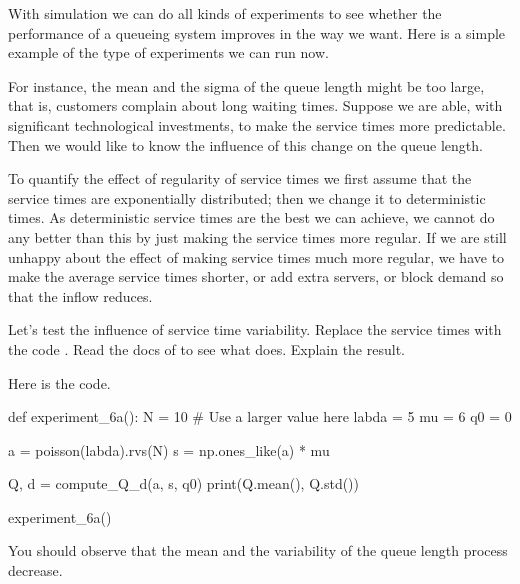 With simulation we can do all kinds of experiments to see whether the performance of a queueing system improves in the way we want.
Here is a simple example of the type of experiments we can run now.

For instance, the mean and the sigma of the queue length might be too large, that is, customers complain about long waiting times.
Suppose we are able, with significant technological investments, to make the service times more predictable.
Then we would like to know the influence of this change on the queue length.

To quantify the effect of regularity of service times we first assume that the service times are exponentially distributed; then we change it to deterministic times.
As deterministic service times are the best we can achieve, we cannot do any better than this by just making the service times more regular.
If we are still unhappy about the effect of making service times much more regular, we have to make the average service times shorter, or add extra servers, or block demand so that the inflow reduces.

\begin{exercise}
  Let's test the influence of service time variability.
  Replace the service times with the code .
  Read the docs of  to see what  does.
  Explain the result.

\begin{solution}
Here is the code.
\begin{pyverbatim}
def experiment_6a():
    N = 10 # Use a larger value here
    labda = 5
    mu = 6
    q0 = 0

    a = poisson(labda).rvs(N)
    s = np.ones_like(a) * mu

    Q, d = compute_Q_d(a, s, q0)
    print(Q.mean(), Q.std())

experiment_6a()
\end{pyverbatim}

You should observe that the mean and the variability of the queue length process decrease.
\end{solution}
\end{exercise}



